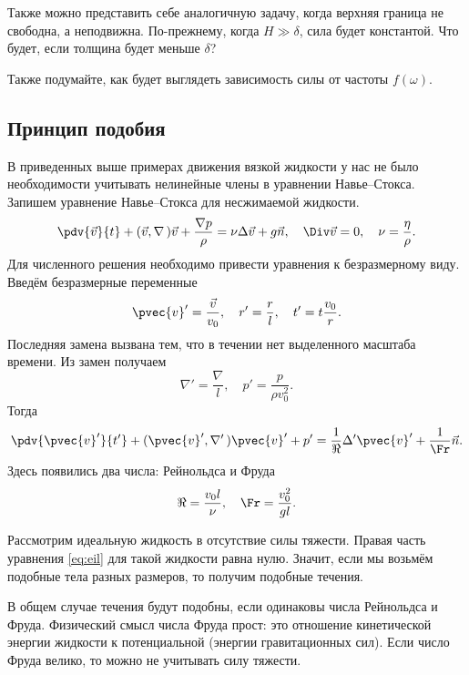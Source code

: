 Также можно представить себе аналогичную задачу, когда верхняя граница не свободна, а неподвижна. По-прежнему, когда $H \gg \delta$, сила будет константой. Что будет, если толщина будет меньше $\delta$?

Также подумайте, как будет выглядеть зависимость силы от частоты $f(\omega)$.


\subsection{Принцип подобия}
В приведенных выше примерах движения вязкой жидкости у нас не было необходимости учитывать нелинейные члены в уравнении Навье--Стокса.
Запишем уравнение Навье--Стокса для несжимаемой жидкости.
\begin{equation}
	\label{eq:eil}
    \pdv{\vec{v}}{t}+(\vec{v},\nabla\,)\vec{v}+\frac{\nabla p}{\rho}=
    \nu \Delta \vec{v} + g \vec{n}, \quad
    \Div \vec{v} = 0, \quad \nu=\frac{\eta}{\rho}.
\end{equation}
Для численного решения необходимо привести уравнения к безразмерному виду. Введём безразмерные переменные
\begin{equation}
    \pvec{v}' = \frac{\vec{v}}{v_0}, \quad
    r' = \frac{r}{l}, \quad
    t' = t \frac{v_0}{r}.
\end{equation}
Последняя замена вызвана тем, что в течении нет выделенного масштаба времени.
Из замен получаем
\begin{equation}
    \nabla' = \frac{\nabla}{l},\quad
    p'=\frac{p}{\rho v_0^2}.
\end{equation}
Тогда
\begin{equation}
    \pdv{\pvec{v}'}{t'}+(\pvec{v}', \nabla'\,)\pvec{v}' + p'=
    \frac{1}{\Re}\Delta' \pvec{v}' + \frac{1}{\Fr} \vec{n}.
\end{equation}
Здесь появились два числа: Рейнольдса и Фруда
\begin{equation}
    \Re=\frac{v_0 l}{\nu}, \quad
    \Fr=\frac{v_0^2}{gl}.
\end{equation}

Рассмотрим идеальную жидкость в отсутствие силы тяжести. Правая часть уравнения \eqref{eq:eil} для такой жидкости равна нулю. Значит, если мы возьмём подобные  тела разных размеров, то получим подобные течения.

В общем случае течения будут подобны, если одинаковы числа Рейнольдса и Фруда. Физический смысл числа Фруда прост: это отношение кинетической энергии жидкости к потенциальной (энергии гравитационных сил). Если число Фруда велико, то можно не учитывать силу тяжести.

